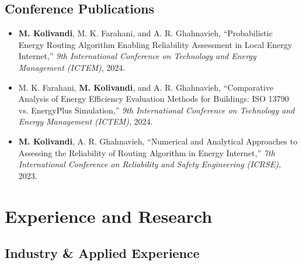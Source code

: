 \documentclass[letter,20pt]{article}
\begin{document}
\subsection*{\fontsize{10pt}{12pt}\selectfont Conference Publications}


\begin{itemize}
[
noitemsep,
topsep=5pt,
leftmargin=3ex
]


\item
\justifying
\textbf{M. Kolivandi},
M. K. Farahani, and A. R. Ghahnavieh,
``Probabilistic Energy Routing Algorithm Enabling Reliability Assessment in Local Energy Internet,''
\textit{9th International Conference on Technology and Energy Management (ICTEM)},
2024.

\vspace{5pt}


\item
\justifying
M. K. Farahani,
\textbf{M. Kolivandi},
and A. R. Ghahnavieh,
``Comparative Analysis of Energy Efficiency Evaluation Methods for Buildings: ISO 13790 vs. EnergyPlus Simulation,''
\textit{9th International Conference on Technology and Energy Management (ICTEM)},
2024.


\vspace{5pt}


\item
\justifying
\textbf{M. Kolivandi},
A. R. Ghahnavieh,
``Numerical and Analytical Approaches to Assessing the Reliability of Routing Algorithm in Energy Internet,''
\textit{7th International Conference on Reliability and Safety Engineering (ICRSE)},
2023.


\end{itemize}






\section{\textbf{Experience and Research}}

\vspace{5pt}


\subsection*{\fontsize{10pt}{12pt}\selectfont Industry \& Applied Experience}
\end{document}
